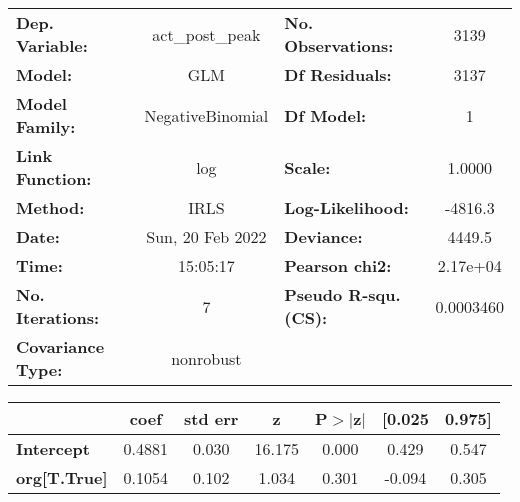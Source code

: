 \begin{center}
\begin{tabular}{lclc}
\toprule
\textbf{Dep. Variable:}   & act\_post\_peak  & \textbf{  No. Observations:  } &     3139    \\
\textbf{Model:}           &       GLM        & \textbf{  Df Residuals:      } &     3137    \\
\textbf{Model Family:}    & NegativeBinomial & \textbf{  Df Model:          } &        1    \\
\textbf{Link Function:}   &       log        & \textbf{  Scale:             } &    1.0000   \\
\textbf{Method:}          &       IRLS       & \textbf{  Log-Likelihood:    } &   -4816.3   \\
\textbf{Date:}            & Sun, 20 Feb 2022 & \textbf{  Deviance:          } &    4449.5   \\
\textbf{Time:}            &     15:05:17     & \textbf{  Pearson chi2:      } &  2.17e+04   \\
\textbf{No. Iterations:}  &        7         & \textbf{  Pseudo R-squ. (CS):} & 0.0003460   \\
\textbf{Covariance Type:} &    nonrobust     & \textbf{                     } &             \\
\bottomrule
\end{tabular}
\begin{tabular}{lcccccc}
                     & \textbf{coef} & \textbf{std err} & \textbf{z} & \textbf{P$> |$z$|$} & \textbf{[0.025} & \textbf{0.975]}  \\
\midrule
\textbf{Intercept}   &       0.4881  &        0.030     &    16.175  &         0.000        &        0.429    &        0.547     \\
\textbf{org[T.True]} &       0.1054  &        0.102     &     1.034  &         0.301        &       -0.094    &        0.305     \\
\bottomrule
\end{tabular}
\end{center}